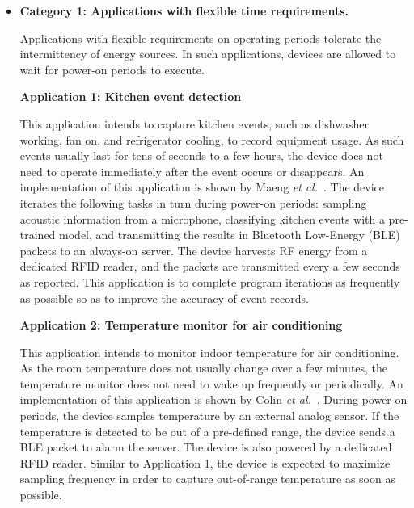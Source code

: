 \begin{itemize}

  \item \textbf{Category 1: Applications with flexible time requirements.}
  
  Applications with flexible requirements on operating periods tolerate the intermittency of energy sources. In such applications, devices are allowed to wait for power-on periods to execute.

  \textbf{Application 1: Kitchen event detection} 
  
  This application intends to capture kitchen events, such as dishwasher working, fan on, and refrigerator cooling, to record equipment usage. 
  As such events usually last for tens of seconds to a few hours, the device does not need to operate immediately after the event occurs or disappears. 
  An implementation of this application is shown by Maeng \textit{et al.}~\cite{maeng2019supporting}. 
  The device iterates the following tasks in turn during power-on periods: sampling acoustic information from a microphone, classifying kitchen events with a pre-trained model, and transmitting the results in Bluetooth Low-Energy (BLE) packets to an always-on server. 
  The device harvests RF energy from a dedicated RFID reader, and the packets are transmitted every a few seconds as reported. 
  This application is to complete program iterations as frequently as possible so as to improve the accuracy of event records. 

  \textbf{Application 2: Temperature monitor for air conditioning}

  This application intends to monitor indoor temperature for air conditioning. 
  As the room temperature does not usually change over a few minutes, the temperature monitor does not need to wake up frequently or periodically. 
  An implementation of this application is shown by Colin \textit{et al.}~\cite{colin2018reconfigurable}. 
  During power-on periods, the device samples temperature by an external analog sensor. 
  If the temperature is detected to be out of a pre-defined range, the device sends a BLE packet to alarm the server. 
  The device is also powered by a dedicated RFID reader. 
  Similar to Application 1, the device is expected to maximize sampling frequency in order to capture out-of-range temperature as soon as possible.


\end{itemize}
